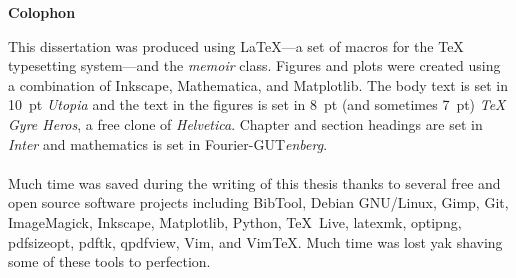 \appendix




\ifdraftdoc
  
  \setlength{\bibsep}{0pt plus 0.3ex}
  \setcounter{footnote}{0}
  \def\thefootnote{\fnsymbol{footnote}}
  \def\bibpreamble{{\normalsize \emph{Note.---} All references that are publicly available on the Internet have archival versions at the Wayback Machine.%
    \footnote{\url{https://web.archive.org}}}}
  \small
  
\else
  \hypersetup{linkcolor=backref} %
  \def\bibfont{\small}
  \setlength\bibitemsep{0pt}
  \printbibliography[prenote=myprenote]
\fi


\ifsustyle
  \relax
\else
  \ifdeadtree
    \cleardoublepage
    \cleartooddpage
  \else
    \newpage
  \fi
  \thispagestyle{empty}
  \centering
  \phantom{}
  \vfill
  {\normalsize\sffamily\bfseries Colophon}\\[1.5em]
  \begin{minipage}{0.75\textwidth}
    \fussy
    \small This dissertation was produced using \LaTeX---a set of macros for the {\TeX} typesetting system---and the \emph{memoir} class.
    Figures and plots were created using a combination of Inkscape, Mathematica, and Matplotlib.
    The body text is set in 10~pt \emph{Utopia} and the text in the figures is set in 8~pt (and sometimes 7~pt) \emph{{\TeX} Gyre Heros}, a free clone of \emph{Helvetica}.
    Chapter and section headings are set in \emph{Inter} and mathematics is set in Fourier-GUT\emph{enberg}.\\\\
    Much time was saved during the writing of this thesis thanks to several free and open source software projects including
    BibTool,
    Debian GNU/Linux,
    Gimp,
    Git,
    ImageMagick,
    Inkscape,
    Matplotlib,
    Python,
    \TeX~Live,
    latexmk,
    optipng,
    pdfsizeopt,
    pdftk,
    qpdfview,
    Vim,
    and Vim\TeX.
    Much time was lost yak shaving some of these tools to perfection.
  \end{minipage}
  \vfill
\fi



